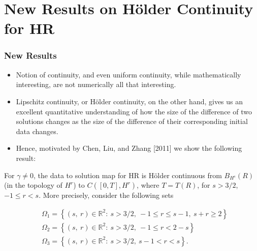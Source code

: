 \documentclass{beamer}
\numberwithin{equation}{section}
\newcommand{\rr}{\mathbb{R}}
\begin{document}
\section{New Results on H\"older Continuity for HR}
\begin{frame}
  \frametitle{New Results}
  \begin{itemize}
      \pause
    \item
  Notion of continuity, and even uniform continuity, while mathematically interesting, are not numerically all that interesting. 
  \pause
\item
  Lipschitz continuity, or H\"older continuity, on the other hand, gives us an excellent quantitative understanding of how the size of the difference of two solutions changes as the size of the difference of their corresponding initial data changes.
  \pause
\item
  Hence, motivated by Chen, Liu, and Zhang [2011] we show the
following result:
\end{itemize}
\end{frame}
\begin{frame}


\begin{theorem}
For $\gamma \neq 0$, the
data to solution map for HR is H\"older continuous from $B_{H^{s}}(R)$ (in
the topology of $H^{r}$) to $C([0, T], H^{r})$, where $T = T(R)$, for $s >
3/2$, $-1 \le r < s$. More
precisely, consider the following sets 

  
  \begin{equation*}
  \begin{split}
      & \Omega_{1} = \left\{ (s, \ r) \in \rr^{2}:
     \ s>3/2, \ -1 \le r \le s-1, \ s + r \ge 2  \right\}
    \\
    & \Omega_{2} = \left\{ (s, \ r) \in \rr^{2}:
     \ s>3/2, \ -1 \le r < 2-s \right\}
    \\
    & \Omega_{3} = \left\{ (s, \ r) \in \rr^{2}:
    \  s>3/2, \  s-1 < r < s  \right\}.
    \end{split}
\end{equation*}
\end{theorem}
\end{frame}
\end{document}
